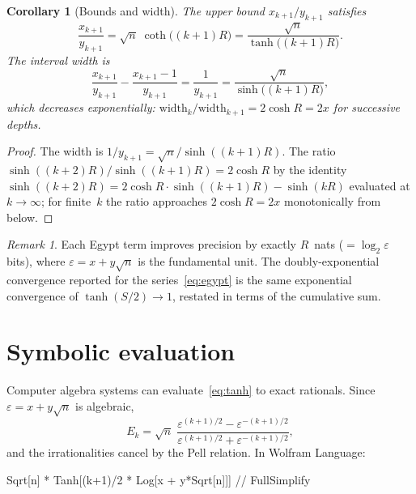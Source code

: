 \documentclass[11pt]{article}
\newtheorem{corollary}[theorem]{Corollary}
\theoremstyle{definition}
\theoremstyle{remark}
\newtheorem{remark}[theorem]{Remark}
\begin{document}
\begin{corollary}[Bounds and width]\label{cor:bounds}
The upper bound $x_{k+1}/y_{k+1}$ satisfies
\[
\frac{x_{k+1}}{y_{k+1}} = \sqrt{n}\;\coth\bigl((k{+}1)R\bigr)
= \frac{\sqrt{n}}{\tanh\bigl((k{+}1)R\bigr)}.
\]
The interval width is
\begin{equation}\label{eq:width}
\frac{x_{k+1}}{y_{k+1}} - \frac{x_{k+1} - 1}{y_{k+1}}
= \frac{1}{y_{k+1}}
= \frac{\sqrt{n}}{\sinh\bigl((k{+}1)R\bigr)},
\end{equation}
which decreases exponentially:
$\text{width}_k / \text{width}_{k+1} = 2\cosh R = 2x$ for
successive depths.
\end{corollary}

\begin{proof}
The width is $1/y_{k+1} = \sqrt{n}/\sinh((k{+}1)R)$.
The ratio $\sinh((k{+}2)R)/\sinh((k{+}1)R)
= 2\cosh R$ by the identity
$\sinh((k{+}2)R) = 2\cosh R \cdot \sinh((k{+}1)R) - \sinh(kR)$
evaluated at $k \to \infty$; for finite~$k$ the ratio approaches
$2\cosh R = 2x$ monotonically from below.
\end{proof}

\begin{remark}
Each Egypt term improves precision by exactly $R$~nats
($= \log_2\varepsilon$ bits), where $\varepsilon = x + y\sqrt{n}$
is the fundamental unit.
The doubly-exponential convergence reported for the series~\eqref{eq:egypt}
is the same exponential convergence of $\tanh(S/2) \to 1$,
restated in terms of the cumulative sum.
\end{remark}

\section{Symbolic evaluation}

Computer algebra systems can evaluate~\eqref{eq:tanh}
to exact rationals.  Since $\varepsilon = x + y\sqrt{n}$ is algebraic,
\[
E_k = \sqrt{n}\;\frac{\varepsilon^{(k+1)/2} - \varepsilon^{-(k+1)/2}}
     {\varepsilon^{(k+1)/2} + \varepsilon^{-(k+1)/2}},
\]
and the irrationalities cancel by the Pell relation.
In Wolfram Language:

\medskip
\begin{center}
\ttfamily Sqrt[n] * Tanh[(k+1)/2 * Log[x + y*Sqrt[n]]] // FullSimplify
\end{center}
\medskip
\end{document}
